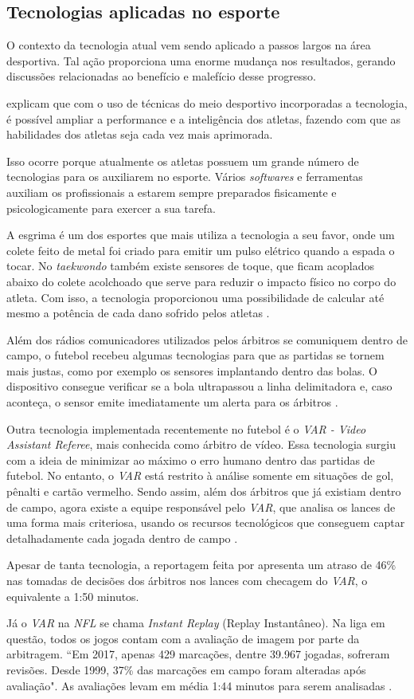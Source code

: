 \subsection{Tecnologias aplicadas no esporte}

O contexto da tecnologia atual vem sendo aplicado a passos largos na área desportiva. Tal ação proporciona uma enorme mudança nos resultados, gerando discussões relacionadas ao benefício e malefício desse progresso.

 explicam que com o uso de técnicas do meio desportivo incorporadas a tecnologia, é possível ampliar a performance e a inteligência dos atletas, fazendo com que as habilidades dos atletas seja cada vez mais aprimorada.

Isso ocorre porque atualmente os atletas possuem um grande número de tecnologias para os auxiliarem no esporte. Vários \textit{softwares} e ferramentas auxiliam os profissionais a estarem sempre preparados fisicamente e psicologicamente para exercer a sua tarefa.

A esgrima é um dos esportes que mais utiliza a tecnologia a seu favor, onde um colete feito de metal foi criado para emitir um pulso elétrico quando a espada o tocar. No \textit{taekwondo} também existe sensores de toque, que ficam acoplados abaixo do colete acolchoado que serve para reduzir o impacto físico no corpo do atleta. Com isso, a tecnologia proporcionou uma possibilidade de calcular até mesmo a potência de cada dano sofrido pelos atletas \cite{SCHATTENBERG2013}.

Além dos rádios comunicadores utilizados pelos árbitros se comuniquem dentro de campo, o futebol recebeu algumas tecnologias para que as partidas se tornem mais justas, como por exemplo os sensores implantando dentro das bolas. O dispositivo consegue verificar se a bola ultrapassou a linha delimitadora e, caso aconteça, o sensor emite imediatamente um alerta para os árbitros \cite{G12012}.

Outra tecnologia implementada recentemente no futebol é o \textit{VAR - Video Assistant Referee}, mais conhecida como árbitro de vídeo. Essa tecnologia surgiu com a ideia de minimizar ao máximo o erro humano dentro das partidas de futebol. No entanto, o \textit{VAR} está restrito à análise somente em situações de gol, pênalti e cartão vermelho. Sendo assim, além dos árbitros que já existiam dentro de campo, agora existe a equipe responsável pelo \textit{VAR}, que analisa os lances de uma forma mais criteriosa, usando os recursos tecnológicos que conseguem captar detalhadamente cada jogada dentro de campo \cite{CANALTECH2019}.

Apesar de tanta tecnologia, a reportagem feita por  apresenta um atraso de 46\% nas tomadas de decisões dos árbitros  nos lances com checagem do \textit{VAR}, o equivalente a 1:50 minutos.

Já o \textit{VAR} na \textit{NFL} se chama \textit{Instant Replay} (Replay Instantâneo). Na liga em questão, todos os jogos contam com a avaliação de imagem por parte da arbitragem. “Em 2017, apenas 429 marcações, dentre 39.967 jogadas, sofreram revisões. Desde 1999, 37\% das marcações em campo foram alteradas após avaliação". As avaliações levam em média 1:44 minutos para serem analisadas \cite{VARESPN2018}.
